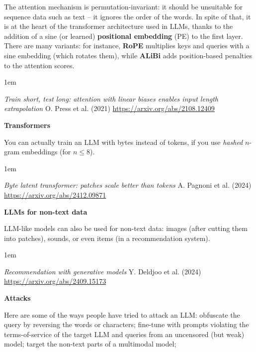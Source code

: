 \documentclass[a5paper]{article}
\let\d\textbf
\let\leq\leqslant
\newenvironment{reference}{%
  \medskip\goodbreak
  \parskip 0pt
  \raggedright
  \leftskip 1em
  \obeylines
}{\par\medskip\goodbreak}
\def\subsection#1{{\par\bigskip\goodbreak\large\bfseries #1\par}}
\begin{document}
The attention mechanism is permutation-invariant: it should be unsuitable
for sequence data such as text -- it ignores the order of the words.
In spite of that, it is at the heart of the transformer architecture used in LLMs,
thanks to the addition of a sine (or learned) \d{positional embedding} (PE) to the first layer.
There are many variants:
for instance, \d{RoPE} multiplies keys and queries with a sine embedding (which rotates them),
while \d{ALiBi} adds position-based penalties to the attention scores.

\begin{reference}
  \emph{Train short, test long: attention with linear biases enables input length extrapolation}
  O. Press et al. (2021)
  \url{https://arxiv.org/abs/2108.12409}
\end{reference}

\subsection{Transformers}

You can actually train an LLM with bytes instead of tokens,
if you use \emph{hashed} $n$-gram embeddings (for $n\leq8$).

\begin{reference}
  \emph{Byte latent transformer:  patches scale better than tokens}
  A. Pagnoni et al. (2024)
  \url{https://arxiv.org/abs/2412.09871}
\end{reference}

\subsection{LLMs for non-text data}

LLM-like models can also be used for non-text data:
images (after cutting them into patches), sounds,
or even items (in a recommendation system).

\begin{reference}
  \emph{Recommendation with generative models}
  Y. Deldjoo et al. (2024)
  \url{https://arxiv.org/abs/2409.15173}
\end{reference}

\subsection{Attacks}

Here are some of the ways people have tried to attack an LLM:
obfuscate the query by reversing the words or characters;
fine-tune with prompts violating the terms-of-service of the target LLM and queries from an uncensored (but weak) model;
target the non-text parts of a multimodal model;
\end{document}
